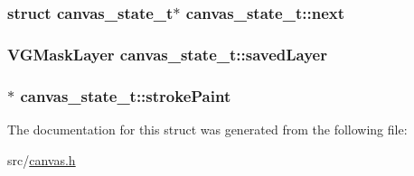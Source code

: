 \subsubsection[{next}]{\setlength{\rightskip}{0pt plus 5cm}struct {\bf canvas\+\_\+state\+\_\+t}$\ast$ canvas\+\_\+state\+\_\+t\+::next}\label{structcanvas__state__t_affd976ea64b3c8ac9ee660b20e8be5a9}
\hypertarget{structcanvas__state__t_a46394e3d2c0bfac283b820478a8e54e6}{}
\subsubsection[{saved\+Layer}]{\setlength{\rightskip}{0pt plus 5cm}V\+G\+Mask\+Layer canvas\+\_\+state\+\_\+t\+::saved\+Layer}\label{structcanvas__state__t_a46394e3d2c0bfac283b820478a8e54e6}
\hypertarget{structcanvas__state__t_a0c8736008fd042235f9347563ff7b998}{}
\subsubsection[{stroke\+Paint}]{$\ast$ canvas\+\_\+state\+\_\+t\+::stroke\+Paint}\label{structcanvas__state__t_a0c8736008fd042235f9347563ff7b998}


The documentation for this struct was generated from the following file\+:\begin{DoxyCompactItemize}
\item 
src/\hyperlink{canvas_8h}{canvas.\+h}\end{DoxyCompactItemize}
